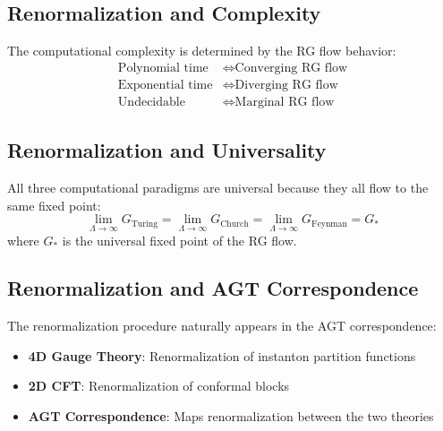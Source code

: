 \subsection{Renormalization and Complexity}

\begin{theorem}
\label{thm:renorm-complexity}
The computational complexity is determined by the RG flow behavior:
\begin{align}
\text{Polynomial time} &\Leftrightarrow \text{Converging RG flow} \\
\text{Exponential time} &\Leftrightarrow \text{Diverging RG flow} \\
\text{Undecidable} &\Leftrightarrow \text{Marginal RG flow}
\end{align}
\end{theorem}

\subsection{Renormalization and Universality}

\begin{theorem}
\label{thm:renorm-universality}
All three computational paradigms are universal because they all flow to the same fixed point:
\[
\lim_{\Lambda \to \infty} G_{\text{Turing}} = \lim_{\Lambda \to \infty} G_{\text{Church}} = \lim_{\Lambda \to \infty} G_{\text{Feynman}} = G_*
\]
where $G_*$ is the universal fixed point of the RG flow.
\end{theorem}

\subsection{Renormalization and AGT Correspondence}

\begin{theorem}
\label{thm:renorm-agt}
The renormalization procedure naturally appears in the AGT correspondence:
\begin{itemize}
\item \textbf{4D Gauge Theory}: Renormalization of instanton partition functions
\item \textbf{2D CFT}: Renormalization of conformal blocks
\item \textbf{AGT Correspondence}: Maps renormalization between the two theories
\end{itemize}
\end{theorem}

